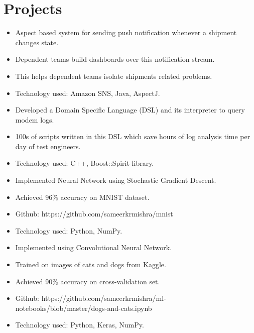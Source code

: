 \documentclass[a4paper,11pt]{simpleresume}
\begin{document}
\section{Projects}
\begin{itemize}
\item Aspect based system for sending push notification whenever a shipment changes state.
\item Dependent teams build dashboards over this notification stream.
\item This helps dependent teams isolate shipments related problems. 
\item Technology used: Amazon SNS, Java, AspectJ.
\end{itemize}
\begin{itemize}
    \item Developed a Domain Specific Language (DSL) and its interpreter to query modem logs.
    \item 100s of scripts written in this DSL which save hours of log analysis time per day of test engineers.
    \item Technology used: C++, Boost::Spirit library.
    \end{itemize}
\begin{itemize}
    \item Implemented Neural Network using Stochastic Gradient Descent.
    \item Achieved 96\% accuracy on MNIST dataset.
    \item Github: https://github.com/sameerkrmishra/mnist
    \item Technology used: Python, NumPy.
\end{itemize}
\begin{itemize}
    \item Implemented using Convolutional Neural Network.
    \item Trained on images of cats and dogs from Kaggle.
    \item Achieved 90\% accuracy on cross-validation set.
    \item Github: https://github.com/sameerkrmishra/ml- notebooks/blob/master/dogs-and-cats.ipynb
    \item Technology used: Python, Keras, NumPy.
\end{itemize}
\end{document}
